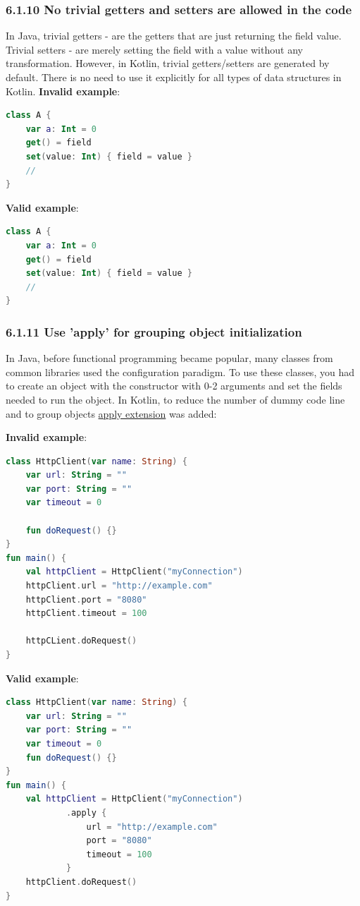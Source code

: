 \subsubsection*{\textbf{6.1.10 No trivial getters and setters are allowed in the code}}
\leavevmode\newline
\label{sec:6.1.10}
In Java, trivial getters - are the getters that are just returning the field value.
Trivial setters - are merely setting the field with a value without any transformation.
However, in Kotlin, trivial getters/setters are generated by default. There is no need to use it explicitly for all types of data structures in Kotlin.
\textbf{Invalid example}:
\begin{lstlisting}[language=Kotlin]
class A {
    var a: Int = 0
    get() = field
    set(value: Int) { field = value }
    //
}
\end{lstlisting}
\textbf{Valid example}:
\begin{lstlisting}[language=Kotlin]
class A {
    var a: Int = 0
    get() = field
    set(value: Int) { field = value }
    //
}
\end{lstlisting}
\subsubsection*{\textbf{6.1.11 Use 'apply' for grouping object initialization}}
\leavevmode\newline
\label{sec:6.1.11}
In Java, before functional programming became popular, many classes from common libraries used the configuration paradigm.
To use these classes, you had to create an object with the constructor with 0-2 arguments and set the fields needed to run the object.
In Kotlin, to reduce the number of dummy code line and to group objects \href{https://kotlinlang.org/api/latest/jvm/stdlib/kotlin/apply.html}{apply extension} was added:

\textbf{Invalid example}:
\begin{lstlisting}[language=Kotlin]
class HttpClient(var name: String) {
    var url: String = ""
    var port: String = ""
    var timeout = 0

    fun doRequest() {}
}
fun main() {
    val httpClient = HttpClient("myConnection")
    httpClient.url = "http://example.com"
    httpClient.port = "8080"
    httpClient.timeout = 100

    httpCLient.doRequest()
}
\end{lstlisting}
\textbf{Valid example}:
\begin{lstlisting}[language=Kotlin]
class HttpClient(var name: String) {
    var url: String = ""
    var port: String = ""
    var timeout = 0
    fun doRequest() {}
}
fun main() {
    val httpClient = HttpClient("myConnection")
            .apply {
                url = "http://example.com"
                port = "8080"
                timeout = 100
            }
    httpClient.doRequest()
}
\end{lstlisting}
